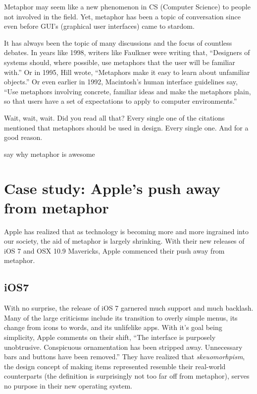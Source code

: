 \documentclass[11pt, oneside]{article}   	%
\begin{document}
Metaphor may seem like a new phenomenon in CS (Computer Science) to people not involved in the field. Yet, metaphor has been a topic of conversation since even before GUI's (graphical user interfaces) came to stardom.

It has always been the topic of many discussions and the focus of countless debates.
In years like 1998, writers like Faulkner were writing that, ``Designers of systems should, where possible, use metaphors that the user will be familiar with.'' \cite{essence}  Or in 1995, Hill wrote, ``Metaphors make it easy to learn about unfamiliar objects.'' \cite{practical} Or even earlier in 1992, Macintosh's human interface guidelines say, ``Use metaphors involving concrete, familiar ideas and make the metaphors plain, so that users have a set of expectations to apply to computer environments.'' \cite{apple}

Wait, wait, wait. Did you read all that? Every single one of the citations mentioned that metaphors should be used in design. Every single one. And for a good reason.


\cite{reification}
say why metaphor is awesome

\cite{bae16}

\section{Case study: Apple's push away from metaphor}
Apple has realized that as technology is becoming more and more ingrained into our society, the aid of metaphor is largely shrinking. With their new releases of iOS 7 and OSX 10.9 Mavericks, Apple commenced their push away from metaphor.

\subsection{iOS7}
With no surprise, the release of iOS 7 garnered much support and much backlash. Many of the large criticisms include its transition to overly simple menus, its change from icons to words, and its unlifelike apps. With it's goal being simplicity, Apple comments on their shift, ``The interface is purposely unobtrusive. Conspicuous ornamentation has been stripped away. Unnecessary bars and buttons have been removed.'' \cite{apple-design} They have realized that \textit{skeuomorhpism}, the design concept of making items represented resemble their real-world counterparts (the definition is surprisingly not too far off from metaphor), serves no purpose in their new operating system.
\end{document}
